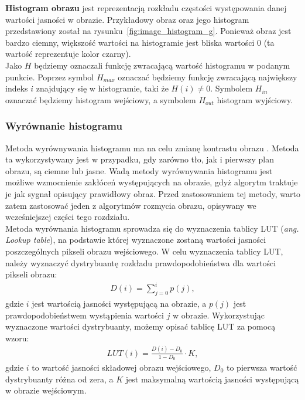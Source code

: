 \textbf{Histogram obrazu} jest reprezentacją rozkładu częstości występowania danej wartości jasności w obrazie. Przykładowy obraz oraz jego histogram przedstawiony został na rysunku~\ref{fig:image_histogram_g}. Ponieważ obraz jest bardzo ciemny, większość wartości na histogramie jest bliska wartości 0 (ta wartość reprezentuje kolor czarny).\\
Jako $H$ będziemy oznaczali funkcję zwracającą wartość histogramu w podanym punkcie. Poprzez symbol $H_{max}$ oznaczać będziemy funkcję zwracającą największy indeks $i$ znajdujący się w histogramie, taki że $H(i) \neq 0$. Symbolem $H_{in}$ oznaczać będziemy histogram wejściowy, a symbolem $H_{out}$ histogram wyjściowy.\\

\subsubsection{Wyrównanie histogramu}\label{sssec:histogram_eq}
Metoda wyrównywania histogramu ma na celu zmianę kontrastu obrazu \cite{acharya05}. Metoda ta wykorzystywany jest w przypadku, gdy zarówno tło, jak i pierwszy plan obrazu, są ciemne lub jasne. Wadą metody wyrównywania histogramu jest możliwe wzmocnienie zakłóceń występujących na obrazie, gdyż algorytm traktuje je jak sygnał opisujący prawidłowy obraz. Przed zastosowaniem tej metody, warto zatem zastosować jeden z algorytmów rozmycia obrazu, opisywany we wcześniejszej części tego rozdziału.\\
Metoda wyrównania histogramu sprowadza się do wyznaczenia tablicy LUT (\textit{ang. Lookup table}), na podstawie której wyznaczone zostaną wartości jasności poszczególnych pikseli obrazu wejściowego. W celu wyznaczenia tablicy LUT, należy wyznaczyć dystrybuantę rozkładu prawdopodobieństwa dla wartości pikseli obrazu:
\begin{gather*}
  D(i) = \sum\limits_{j=0}^i p(j),
\end{gather*}
gdzie $i$ jest wartością jasności występującą na obrazie, a $p(j)$ jest prawdopodobieństwem wystąpienia wartości $j$ w obrazie. Wykorzystując wyznaczone wartości dystrybuanty, możemy opisać tablicę LUT za pomocą wzoru:
\begin{gather*}
  LUT(i) = \frac{D(i)-D_0}{1-D_0} \cdot K,
\end{gather*}
gdzie $i$ to wartość jasności składowej obrazu wejściowego, $D_0$ to pierwsza wartość dystrybuanty różna od zera, a $K$ jest maksymalną wartością jasności występującą w obrazie wejściowym.\\
